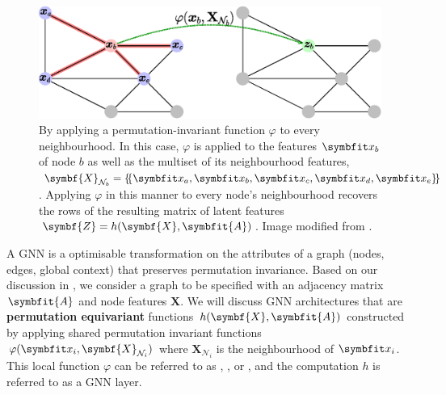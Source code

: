 \begin{figure}[th]
    \centering
    \includegraphics[width=\linewidth]{chapters/assets/graph-figs/GC_GDL.eps}
    \caption{By applying a permutation-invariant function $\varphi$ to every neighbourhood. In this case, $\varphi$ is applied to the features $\bfitx_b$ of node $b$ as well as the multiset  of its neighbourhood features, $\symbf{X}_{\mathcal{N}_b} = \ldblbrace\bfitx_a, \bfitx_b, \bfitx_c, \bfitx_d, \bfitx_e\rdblbrace$. Applying $\varphi$ in this manner to every node's neighbourhood recovers the rows of the resulting matrix of latent features $\symbf{Z}=h(\symbf{X}, \symbfit{A})$. Image modified from \parencite{Bronstein2021}.}
    \label{fig:gc_gdl}
\end{figure}%

A GNN is a optimisable transformation on the attributes of a graph (nodes, edges, global context) that preserves permutation invariance.
Based on our discussion in , we consider a graph to be specified with an adjacency matrix $\symbfit{A}$ and node features $\symbf{X}$. We will discuss GNN architectures that are \textbf{permutation equivariant} functions $h(\symbf{X}, \symbfit{A})$ constructed by applying shared permutation invariant functions $\varphi(\bfitx_i, \symbf{X}_{\mathcal{N}_i})$ where $\symbf{X}_{\mathcal{N}_i}$ is the neighbourhood of $\bfitx_i$. This local function $\varphi$ can be referred to as , , or , and the computation $h$ is referred to as a GNN layer.

